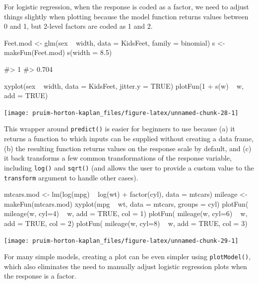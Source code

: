 \noindent
For logistic regression, when the response is coded as a factor, we need
to adjust things slightly when plotting because the model function
returns values between 0 and 1, but 2-level factors are coded as 1 and
2.

\begin{Schunk}
\begin{Sinput}
Feet.mod <- glm(sex ~ width, data = KidsFeet, family = binomial)
s <- makeFun(Feet.mod)
s(width = 8.5)
\end{Sinput}
\begin{Soutput}
#>     1 
#> 0.704
\end{Soutput}
\begin{Sinput}
xyplot(sex ~ width, data = KidsFeet, jitter.y = TRUE)
plotFun(1 + s(w) ~ w, add = TRUE)
\end{Sinput}


\begin{center}\texttt{[image: pruim-horton-kaplan\_files/figure-latex/unnamed-chunk-28-1]} \end{center}

\end{Schunk}

This wrapper around \texttt{predict()} is easier for beginners to use
because (a) it returns a function to which inputs can be supplied
without creating a data frame, (b) the resulting function returns values
on the response scale by default, and (c) it back transforms a few
common transformations of the response variable, including
\texttt{log()} and \texttt{sqrt()} (and allows the user to provide a
custom value to the \texttt{transform} argument to handle other cases).

\begin{Schunk}
\begin{Sinput}
mtcars.mod <- lm(log(mpg) ~ log(wt) + factor(cyl), data = mtcars)
mileage <- makeFun(mtcars.mod)
xyplot(mpg ~ wt, data = mtcars, groups = cyl)
plotFun( mileage(w, cyl=4) ~ w, add = TRUE, col = 1)
plotFun( mileage(w, cyl=6) ~ w, add = TRUE, col = 2)
plotFun( mileage(w, cyl=8) ~ w, add = TRUE, col = 3)
\end{Sinput}


\begin{center}\texttt{[image: pruim-horton-kaplan\_files/figure-latex/unnamed-chunk-29-1]} \end{center}

\end{Schunk}

For many simple models, creating a plot can be even simpler using
\texttt{plotModel()}, which also eliminates the need to manually adjust
logistic regression plots when the response is a factor.

